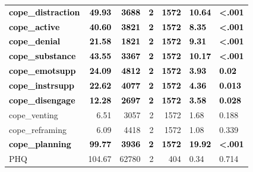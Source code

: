 \documentclass[]{article}
\begin{document}
\begin{table}[H]
\begin{tabular}[t]{lrrrrll}
\textcolor{black}{\textbf{cope\_distraction}} & \textcolor{black}{\textbf{49.93}} & \textcolor{black}{\textbf{3688}} & \textcolor{black}{\textbf{2}} & \textcolor{black}{\textbf{1572}} & \textcolor{black}{\textbf{10.64}} & \textcolor{black}{\textbf{<.001}}\\
\textcolor{black}{\textbf{cope\_active}} & \textcolor{black}{\textbf{40.60}} & \textcolor{black}{\textbf{3821}} & \textcolor{black}{\textbf{2}} & \textcolor{black}{\textbf{1572}} & \textcolor{black}{\textbf{8.35}} & \textcolor{black}{\textbf{<.001}}\\
\addlinespace
\textcolor{black}{\textbf{cope\_denial}} & \textcolor{black}{\textbf{21.58}} & \textcolor{black}{\textbf{1821}} & \textcolor{black}{\textbf{2}} & \textcolor{black}{\textbf{1572}} & \textcolor{black}{\textbf{9.31}} & \textcolor{black}{\textbf{<.001}}\\
\textcolor{black}{\textbf{cope\_substance}} & \textcolor{black}{\textbf{43.55}} & \textcolor{black}{\textbf{3367}} & \textcolor{black}{\textbf{2}} & \textcolor{black}{\textbf{1572}} & \textcolor{black}{\textbf{10.17}} & \textcolor{black}{\textbf{<.001}}\\
\textcolor{black}{\textbf{cope\_emotsupp}} & \textcolor{black}{\textbf{24.09}} & \textcolor{black}{\textbf{4812}} & \textcolor{black}{\textbf{2}} & \textcolor{black}{\textbf{1572}} & \textcolor{black}{\textbf{3.93}} & \textcolor{black}{\textbf{0.02}}\\
\textcolor{black}{\textbf{cope\_instrsupp}} & \textcolor{black}{\textbf{22.62}} & \textcolor{black}{\textbf{4077}} & \textcolor{black}{\textbf{2}} & \textcolor{black}{\textbf{1572}} & \textcolor{black}{\textbf{4.36}} & \textcolor{black}{\textbf{0.013}}\\
\textcolor{black}{\textbf{cope\_disengage}} & \textcolor{black}{\textbf{12.28}} & \textcolor{black}{\textbf{2697}} & \textcolor{black}{\textbf{2}} & \textcolor{black}{\textbf{1572}} & \textcolor{black}{\textbf{3.58}} & \textcolor{black}{\textbf{0.028}}\\
\addlinespace
cope\_venting & 6.51 & 3057 & 2 & 1572 & 1.68 & 0.188\\
cope\_reframing & 6.09 & 4418 & 2 & 1572 & 1.08 & 0.339\\
\textcolor{black}{\textbf{cope\_planning}} & \textcolor{black}{\textbf{99.77}} & \textcolor{black}{\textbf{3936}} & \textcolor{black}{\textbf{2}} & \textcolor{black}{\textbf{1572}} & \textcolor{black}{\textbf{19.92}} & \textcolor{black}{\textbf{<.001}}\\
PHQ & 104.67 & 62780 & 2 & 404 & 0.34 & 0.714\\

\end{tabular}
\end{table}
\end{document}
